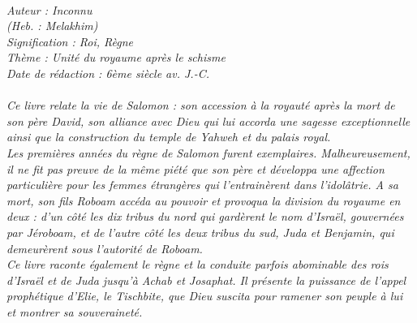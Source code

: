 \BFont
\noindent\hrulefill
{\footnotesize
\textit{
\bigskip
{\centering{}
\\Auteur : Inconnu
\\(Heb. : Melakhim)
\\Signification : Roi, Règne
\\Thème : Unité du royaume après le schisme
\\Date de rédaction : 6ème siècle av. J.-C.\\}
}
\textit{
\\Ce livre relate la vie de Salomon : son accession à la royauté après la mort de son père David, son alliance avec Dieu qui lui accorda une sagesse exceptionnelle ainsi que la construction du temple de Yahweh et du palais royal.
\\Les premières années du règne de Salomon furent exemplaires. Malheureusement, il ne fit pas preuve de la même piété
que son père et développa une affection particulière pour les femmes étrangères qui l’entrainèrent dans l’idolâtrie. A sa
mort, son fils Roboam accéda au pouvoir et provoqua la division du royaume en deux : d’un côté les dix tribus du nord qui gardèrent le nom d’Israël, gouvernées par Jéroboam, et de l’autre côté les deux tribus du sud, Juda et Benjamin, qui demeurèrent sous l’autorité de Roboam.
\\Ce livre raconte également le règne et la conduite parfois abominable des rois d’Israël et de Juda jusqu’à Achab et Josaphat.
Il présente la puissance de l’appel prophétique d’Elie, le Tischbite, que Dieu suscita pour ramener son peuple à lui et
montrer sa souveraineté.\bigskip
}
}
\par\nobreak\noindent\hrulefill
